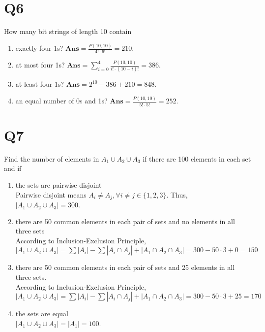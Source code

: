 \documentclass[11pt]{article}
\newenvironment{qparts}{\begin{enumerate}[{(}a{)}]}{\end{enumerate}}
\begin{document}
\section*{Q6}
How many bit strings of length 10 contain
\begin{qparts}
    
    \item exactly four 1s?
    $\textbf{Ans}=\frac{P(10, 10)}{4!\cdot 6!}=210$.

    \item at most four 1s?
    $\textbf{Ans}=\sum_{i=0}^4 \frac{P(10 , 10)}{i! \cdot (10-i)!}=386$.

    \item at least four 1s?
    $\textbf{Ans}=2^{10}-386+210=848$.

    \item an equal number of 0s and 1s?
    $\textbf{Ans}=\frac{P(10, 10)}{5!\cdot 5!}=252$.
\end{qparts}

\section*{Q7}
Find the number of elements in $A_1 \cup  A_2 \cup  A_3$ if there are 100
elements in each set and if
\begin{qparts}
    
    \item the sets are pairwise disjoint\\
    Pairwise disjoint means $A_i\neq A_j, \forall i\neq j \in \{ 1,2,3 \}$. Thus, $\left\vert A_1 \cup A_2 \cup A_3 \right\vert =300$.

    \item there are 50 common elements in each pair of sets and no elements in all three sets\\
    According to Inclusion-Exclusion Principle, \\$
    \left\vert A_1 \cup A_2 \cup A_3 \right\vert=
    \sum\left\vert A_{i } \right\vert-\sum\left\vert A_{i} \cap A_{j } \right\vert+\left\vert A_1 \cap A_2 \cap A_3 \right\vert=300-50\cdot 3+0=150$

    \item there are 50 common elements in each pair of sets and 25 elements in all three sets.\\
    According to Inclusion-Exclusion Principle, \\$
    \left\vert A_1 \cup A_2 \cup A_3 \right\vert=
    \sum\left\vert A_{i } \right\vert-\sum\left\vert A_{i} \cap A_{j } \right\vert+\left\vert A_1 \cap A_2 \cap A_3 \right\vert=300-50\cdot 3+25=170$

    \item the sets are equal\\
    $\left\vert A_1 \cup A_2 \cup A_3 \right\vert=\left\vert A_1 \right\vert=100  $.
\end{qparts}
\end{document}
